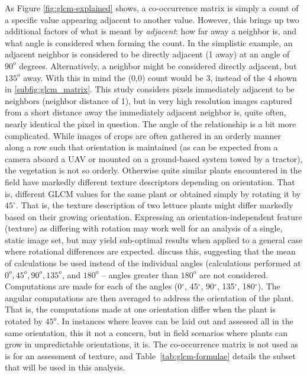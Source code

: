 \documentclass[letterpaper]{report}
\begin{document}
As Figure \ref{fig:glcm-explained} shows, a co-occurrence matrix is simply a count of a specific value appearing adjacent to another value. However, this brings up two additional factors of what is meant by \textit{adjacent}: how far away a neighbor is, and what angle is considered when forming the count. In the simplistic example, an adjacent neighbor is considered to be directly adjacent (1 away) at an angle of $90^o$ degrees. Alternatively, a neighbor might be considered directly adjacent, but $135^o$ away.  With this in mind the (0,0) count would be $3$, instead of the $4$ shown in \ref{subfig:glcm_matrix}. This study considers pixels immediately adjacent to be neighbors (neighbor distance of 1), but  in very high resolution images captured from a short distance away the immediately adjacent neighbor is, quite often, nearly identical the pixel in question. The angle of the relationship is a bit more complicated. While images of crops are often gathered in an orderly manner along a row such that orientation is maintained (as can be expected from a camera aboard a UAV or mounted on a ground-based system towed by a tractor), the vegetation is not so orderly. Otherwise quite similar plants encountered in the field have markedly different texture descriptors depending on orientation. That is, different GLCM values for the same plant or obtained simply by rotating it by $45^{\circ}$. That is, the texture description of two lettuce plants might differ markedly based on their growing orientation. Expressing an orientation-independent feature (texture) as differing with rotation may work well for an analysis of a single, static image set, but may yield sub-optimal results when applied to a general case where rotational differences are expected. \citeauthor*{Haralick1973-gr} discuss this, suggesting that the mean of calculations be used instead of the individual angles (calculations performed at $0^o, 45^o, 90^o, 135^o$, and $180^o$ -- angles greater than $180^o$ are not considered. Computations are made for each of the angles (0$^{\circ}$, 45$^{\circ}$, 90$^{\circ}$, 135$^{\circ}$, 180$^{\circ}$). The angular computations are then averaged to address the orientation of the plant. That is, the computations made at one orientation differ when the plant is rotated by $45^o$. In instances where leaves can be laid out and assessed all in the same orientation, this it not a concern, but in field scenarios where plants can grow in unpredictable orientations, it is. The co-occurrence matrix is not used as is for an assessment of texture, and Table~\ref{tab:glcm-formulae} details the subset that will be used in this analysis.
\end{document}
